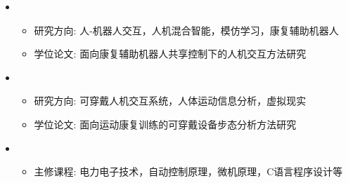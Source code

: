   \begin{itemize}[leftmargin=*]
    \item
      {\small
      \begin{itemize}
        \item{研究方向: 人-机器人交互，人机混合智能，模仿学习，康复辅助机器人}
        \item{学位论文: 面向康复辅助机器人共享控制下的人机交互方法研究}
      \end{itemize}}
      
    \item
      {\small
      \begin{itemize}
        \item{研究方向: 可穿戴人机交互系统，人体运动信息分析，虚拟现实}
        \item{学位论文: 面向运动康复训练的可穿戴设备步态分析方法研究}
      \end{itemize}
      }

      \item
      {\small
      \begin{itemize}
        \item{主修课程: 电力电子技术，自动控制原理，微机原理，C语言程序设计等}
      \end{itemize}
      }

  \end{itemize}
